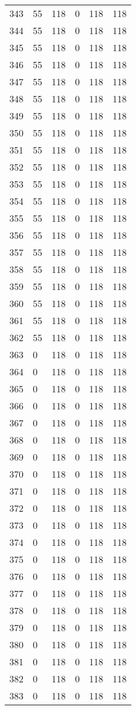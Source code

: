 \documentclass[a4paper]{ctexart}
\begin{document}
\begin{longtable}{p{1cm}|p{2cm}|p{2cm}|p{2cm}|P{2cm}|p{2cm}}
		343&55&118&0&118&118\\
		344&55&118&0&118&118\\
		345&55&118&0&118&118\\
		346&55&118&0&118&118\\
		347&55&118&0&118&118\\
		348&55&118&0&118&118\\
		349&55&118&0&118&118\\
		350&55&118&0&118&118\\
		351&55&118&0&118&118\\
		352&55&118&0&118&118\\
		353&55&118&0&118&118\\
		354&55&118&0&118&118\\
		355&55&118&0&118&118\\
		356&55&118&0&118&118\\
		357&55&118&0&118&118\\
		358&55&118&0&118&118\\
		359&55&118&0&118&118\\
		360&55&118&0&118&118\\
		361&55&118&0&118&118\\
		362&55&118&0&118&118\\
		363&0&118&0&118&118\\
		364&0&118&0&118&118\\
		365&0&118&0&118&118\\
		366&0&118&0&118&118\\
		367&0&118&0&118&118\\
		368&0&118&0&118&118\\
		369&0&118&0&118&118\\
		370&0&118&0&118&118\\
		371&0&118&0&118&118\\
		372&0&118&0&118&118\\
		373&0&118&0&118&118\\
		374&0&118&0&118&118\\
		375&0&118&0&118&118\\
		376&0&118&0&118&118\\
		377&0&118&0&118&118\\
		378&0&118&0&118&118\\
		379&0&118&0&118&118\\
		380&0&118&0&118&118\\
		381&0&118&0&118&118\\
		382&0&118&0&118&118\\
		383&0&118&0&118&118\\

\end{longtable}
\end{document}
